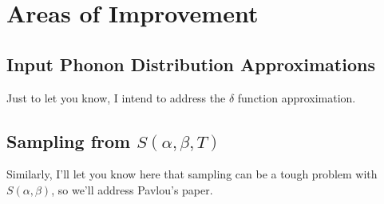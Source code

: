 \documentclass[../master.tex]{subfiles}
\begin{document}









	\section{Areas of Improvement}
		\subsection{Input Phonon Distribution Approximations}
                Just to let you know, I intend to address the $\delta$ function approximation.

		\subsection{Sampling from $S(\alpha,\beta,T)$}
                Similarly, I'll let you know here that sampling can be a tough problem with $S(\alpha,\beta)$, so we'll address Pavlou's paper.
\end{document}
